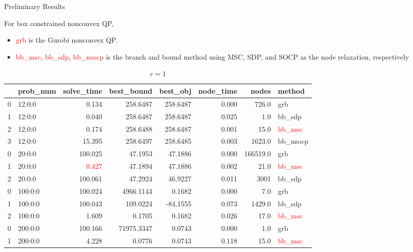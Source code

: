 \documentclass[aspectratio=1610, 10pt]{beamer}
\newcommand{\red}[1]{\textcolor{red}{#1}}
\begin{document}
\begin{frame}[allowframebreaks]{Preliminary Results}


  For box constrained nonconvex QP,
  \begin{itemize}
    \item \red{grb} is the Gurobi nonconvex QP.
    \item \red{bb\_msc}, \red{bb\_sdp}, \red{bb\_nsocp} is the branch and bound method using MSC, SDP, and SOCP as the node relaxation, respectively
  \end{itemize}

  \begin{table}[h!]
    \begin{tabular}{llrrrrrl}
      \toprule
      {} & prob\_num & solve\_time & best\_bound & best\_obj & node\_time & nodes    & method        \\
      \midrule
      0  & 12:0:0    & 0.134       & 258.6487    & 258.6487  & 0.000      & 726.0    & grb           \\
      1  & 12:0:0    & 0.040       & 258.6487    & 258.6487  & 0.025      & 1.0      & bb\_sdp       \\
      2  & 12:0:0    & 0.174       & 258.6488    & 258.6487  & 0.001      & 15.0     & \red{bb\_msc} \\
      3  & 12:0:0    & 15.395      & 258.6497    & 258.6485  & 0.003      & 1623.0   & bb\_nsocp     \\
      \midrule
      0  & 20:0:0    & 100.025     & 47.1953     & 47.1886   & 0.000      & 166519.0 & grb           \\
      1  & 20:0:0    & \red{0.427} & 47.1894     & 47.1886   & 0.002      & 21.0     & \red{bb\_msc} \\
      2  & 20:0:0    & 100.061     & 47.2924     & 46.9227   & 0.011      & 3001     & bb\_sdp       \\
      \midrule
      0  & 100:0:0   & 100.024     & 4966.1144   & 0.1682    & 0.000      & 7.0      & grb           \\
      1  & 100:0:0   & 100.043     & 109.0224    & -84.1555  & 0.073      & 1429.0   & bb\_sdp       \\
      2  & 100:0:0   & 1.609       & 0.1705      & 0.1682    & 0.026      & 17.0     & \red{bb\_msc} \\
      \midrule
      0  & 200:0:0   & 100.166     & 71975.3347  & 0.0743    & 0.000      & 1.0      & grb           \\
      1  & 200:0:0   & 4.228       & 0.0776      & 0.0743    & 0.118      & 15.0     & \red{bb\_msc} \\
      \bottomrule
    \end{tabular}
    \caption{\(r=1\)}


\end{table}
\end{frame}
\end{document}
